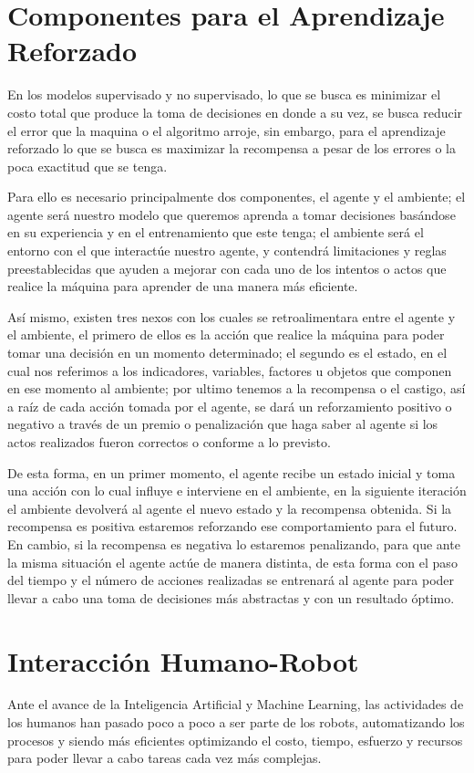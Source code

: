 \documentclass{article}
\begin{document}
\section*{Componentes para el Aprendizaje Reforzado }
En los modelos supervisado y no supervisado, lo que se busca es minimizar el costo total que produce la toma de decisiones en donde a su vez, se busca reducir el error que la maquina o el algoritmo arroje, sin embargo, para el aprendizaje reforzado lo que se busca es maximizar la recompensa a pesar de los errores o la poca exactitud que se tenga.

Para ello es necesario principalmente dos componentes, el agente y el ambiente; el agente será nuestro modelo que queremos aprenda a tomar decisiones basándose en su experiencia y en el entrenamiento que este tenga; el ambiente será el entorno con el que interactúe nuestro agente, y contendrá limitaciones y reglas preestablecidas que ayuden a mejorar con cada uno de los intentos o actos que realice la máquina para aprender de una manera más eficiente.

Así mismo, existen tres nexos con los cuales se retroalimentara entre el agente y el ambiente, el primero de ellos es la acción que realice la máquina para poder tomar una decisión en un momento determinado; el segundo es el estado, en el cual nos referimos a los indicadores, variables, factores u objetos que componen en ese momento al ambiente; por ultimo tenemos a la recompensa o el castigo, así a raíz de cada acción tomada por el agente, se dará un reforzamiento positivo o negativo a través de un premio o penalización que haga saber al agente si los actos realizados fueron correctos o conforme a lo previsto.

De esta forma, en un primer momento, el agente recibe un estado inicial y toma una acción con lo cual influye e interviene en el ambiente, en la siguiente iteración el ambiente devolverá al agente el nuevo estado y la recompensa obtenida. Si la recompensa es positiva estaremos reforzando ese comportamiento para el futuro. En cambio, si la recompensa es negativa lo estaremos penalizando, para que ante la misma situación el agente actúe de manera distinta, de esta forma con el paso del tiempo y el número de acciones realizadas se entrenará al agente para poder llevar a cabo una toma de decisiones más abstractas y con un resultado óptimo.

\section*{Interacción Humano-Robot}
Ante el avance de la Inteligencia Artificial y Machine Learning, las actividades de los humanos han pasado poco a poco a ser parte de los robots, automatizando los procesos y siendo más eficientes optimizando el costo, tiempo, esfuerzo y recursos para poder llevar a cabo tareas cada vez más complejas.
\end{document}
